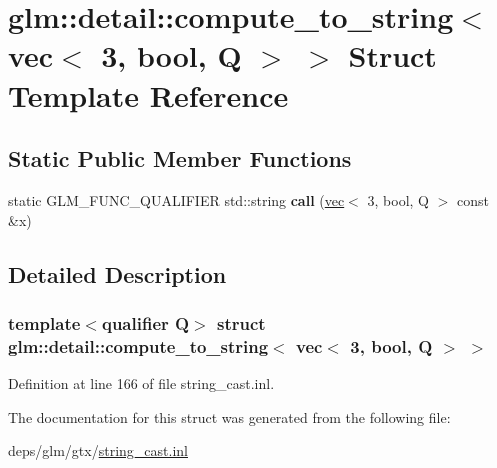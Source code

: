 \hypertarget{structglm_1_1detail_1_1compute__to__string_3_01vec_3_013_00_01bool_00_01Q_01_4_01_4}{}\section{glm\+:\+:detail\+:\+:compute\+\_\+to\+\_\+string$<$ vec$<$ 3, bool, Q $>$ $>$ Struct Template Reference}
\label{structglm_1_1detail_1_1compute__to__string_3_01vec_3_013_00_01bool_00_01Q_01_4_01_4}
\subsection*{Static Public Member Functions}
\begin{DoxyCompactItemize}
\item 
\mbox{\label{structglm_1_1detail_1_1compute__to__string_3_01vec_3_013_00_01bool_00_01Q_01_4_01_4_a05dff60a280662ac95d5e22eae28c730}} 
static G\+L\+M\+\_\+\+F\+U\+N\+C\+\_\+\+Q\+U\+A\+L\+I\+F\+I\+ER std\+::string {\bfseries call} (\hyperlink{structglm_1_1vec}{vec}$<$ 3, bool, Q $>$ const \&x)
\end{DoxyCompactItemize}


\subsection{Detailed Description}
\subsubsection*{template$<$qualifier Q$>$\newline
struct glm\+::detail\+::compute\+\_\+to\+\_\+string$<$ vec$<$ 3, bool, Q $>$ $>$}



Definition at line 166 of file string\+\_\+cast.\+inl.



The documentation for this struct was generated from the following file\+:\begin{DoxyCompactItemize}
\item 
deps/glm/gtx/\hyperlink{string__cast_8inl}{string\+\_\+cast.\+inl}\end{DoxyCompactItemize}

